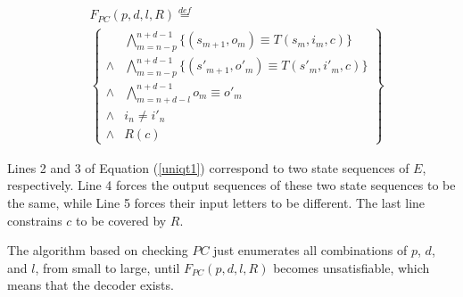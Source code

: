 \documentclass[journal]{IEEEtran}
\begin{document}
\begin{equation}\label{uniqt1}
\begin{split}
&F_{PC}(p,d,l,R)\stackrel{def}{=}\\
&\left\{
\begin{array}{cc}
&\bigwedge_{m=n-p}^{n+d-1}
\{
(s_{m+1},o_m)\equiv T(s_m,i_m,c)
\}
\\
\wedge&\bigwedge_{m=n-p}^{n+d-1}
\{
(s'_{m+1},o'_m)\equiv T(s'_m,i'_m,c)
\}
\\
\wedge&\bigwedge_{m=n+d-l}^{n+d-1}o_m\equiv o'_m \\
\wedge& i_n\ne i'_n \\
\wedge& R(c)
\end{array}
\right\}
\end{split}
\end{equation}


Lines 2 and 3 of Equation (\ref{uniqt1}) correspond to two state sequences of $E$, respectively.
Line 4 forces the output sequences of these two state sequences to be the same,
while Line 5 forces their input letters to be different.
The last line constrains $c$ to be covered by $R$.
% 


The algorithm based on checking $PC$\cite{ShengYuShen:iccad09} just enumerates all combinations of $p$, $d$, and $l$,
from small to large,
until $F_{PC}(p,d,l,R)$ becomes unsatisfiable,
which means that the decoder exists.
\end{document}
